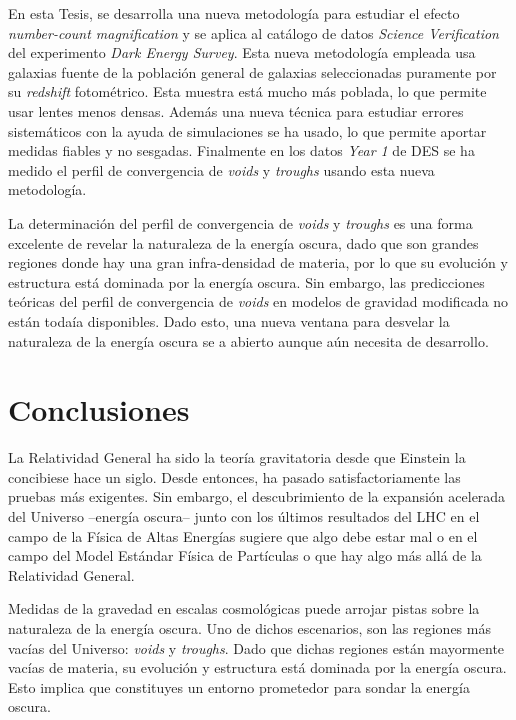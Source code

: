 En esta Tesis, se desarrolla una nueva metodolog\'ia para estudiar el efecto {\it number-count magnification} y se aplica al cat\'alogo de datos {\it Science Verification} del experimento {\it Dark Energy Survey}. Esta nueva metodolog\'ia empleada usa galaxias fuente de la poblaci\'on general de galaxias seleccionadas puramente por su {\it redshift} fotom\'etrico. Esta muestra est\'a mucho m\'as poblada, lo que permite usar lentes menos densas. Adem\'as una nueva t\'ecnica para estudiar errores sistem\'aticos con la ayuda de simulaciones se ha usado, lo que permite aportar medidas fiables y no sesgadas. Finalmente en los datos {\it Year 1} de DES se ha medido el perfil de convergencia de {\it voids} y {\it troughs} usando esta nueva metodolog\'ia.
\newline

La determinaci\'on del perfil de convergencia de {\it voids} y {\it troughs} es una forma excelente de revelar la naturaleza de la energ\'ia  oscura, dado que son grandes regiones donde hay una gran infra-densidad de materia, por lo que su evoluci\'on y estructura est\'a dominada por la energ\'ia oscura. Sin embargo, las predicciones te\'oricas del perfil de convergencia de {\it voids} en modelos de gravidad modificada no est\'an toda\'ia disponibles. Dado esto, una nueva ventana para desvelar la naturaleza de la energ\'ia oscura se a abierto  aunque a\'un necesita de desarrollo.
\section*{Conclusiones}
La Relatividad General ha sido la teor\'ia gravitatoria desde que Einstein la concibiese hace un siglo. Desde entonces, ha pasado satisfactoriamente las pruebas m\'as exigentes. Sin embargo, el descubrimiento de la expansi\'on acelerada del Universo --energ\'ia oscura-- junto con los \'ultimos resultados del LHC en el campo de la F\'isica de Altas Energ\'ias sugiere que algo debe estar mal o en el campo del Model Est\'andar F\'isica de Part\'iculas o que hay algo m\'as all\'a de la Relatividad General.
\newline

Medidas de la gravedad en escalas cosmol\'ogicas puede arrojar pistas sobre la naturaleza de la energ\'ia oscura. Uno de dichos escenarios, son las regiones m\'as vac\'ias del Universo: {\it voids} y {\it troughs}. Dado que dichas regiones est\'an mayormente vac\'ias de materia, su evoluci\'on y estructura est\'a dominada por la energ\'ia oscura. Esto implica que constituyes un entorno prometedor para sondar la energ\'ia oscura.
\newline


